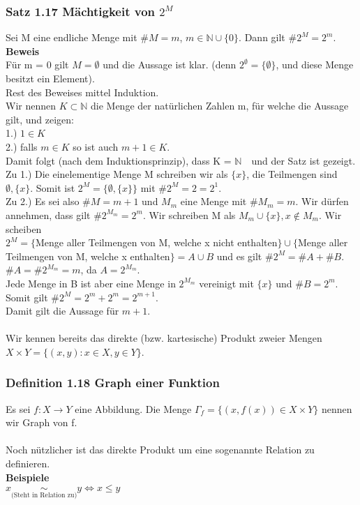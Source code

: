 \documentclass{article}
\newcommand{\N}{\mathbb{N}}
\newcommand{\mN}{$\mathbb{N}$\ }
\begin{document}
\subsubsection{Satz 1.17 Mächtigkeit von $2^M$}
Sei M eine endliche Menge mit $\#M = m$, $m \in \N \cup \{0\}$. Dann gilt $\#2^M = 2^m$.\\
\textbf{Beweis}\\
Für m = 0 gilt $M = \emptyset$ und die Aussage ist klar. (denn $2^\emptyset = \{\emptyset\}$, und diese Menge besitzt ein Element).\\
Rest des Beweises mittel Induktion.\\
Wir nennen $K \subset \N$ die Menge der natürlichen Zahlen m, für welche die Aussage gilt, und zeigen:\\
1.) $1 \in K$\\
2.) falls $m \in K$ so ist auch $m + 1 \in K$.\\
Damit folgt (nach dem Induktionsprinzip), dass  K = \mN\ und der Satz ist gezeigt.\\
Zu 1.) Die einelementige Menge M schreiben wir als $\{x\}$, die Teilmengen sind $\emptyset, \{x\}$. Somit ist $2^M = \{\emptyset, \{x\}\}$ mit $\#2^M = 2 = 2^1$.\\
Zu 2.) Es sei also $\#M = m + 1$  und $M_m$ eine Menge mit $\# M_m = m$. Wir dürfen annehmen, dass gilt $\#2^{M_m} = 2^m$. Wir schreiben M als $M_m \cup \{x\}, x \not\in M_m$. Wir scheiben\\
$2^M = \{$Menge aller Teilmengen von M, welche x nicht enthalten$\} \cup \{$Menge aller Teilmengen von M, welche x enthalten$\} = A \cup B$ und es gilt $\#2^M = \#A + \#B$.\\
$\#A = \#2^{M_m} = m$, da $A = 2^{M_m}$.\\
Jede Menge in B ist aber eine Menge in $2^{M_m}$ vereinigt mit $\{x\}$ und $\#B = 2^m$. Somit gilt $\#2^M = 2^m + 2^m = 2^{m + 1}$.\\
Damit gilt die Aussage für $m + 1$.\\
\\
Wir kennen bereits das direkte (bzw. kartesische) Produkt zweier Mengen $X \times Y = \{(x, y) : x\in X, y \in Y\}$.\\

\subsubsection{Definition 1.18 Graph einer Funktion}
Es sei $f : X \to Y$ eine Abbildung. Die Menge $\Gamma_f = \{(x, f(x)) \in X \times Y\}$ nennen wir Graph von f.\\
\\
Noch nützlicher ist das direkte Produkt um eine sogenannte Relation zu definieren.\\
\textbf{Beispiele}\\
$x \underset{\text{(Steht in Relation zu)}}{\sim} y \Leftrightarrow x \le y$\\
\end{document}
